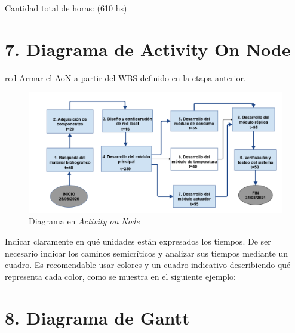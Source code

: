 \documentclass[11pt]{charter}
\begin{document}
Cantidad total de horas: (610 hs)

\section{7. Diagrama de Activity On Node}
\label{sec:AoN}

\begin{consigna}{red}
Armar el AoN a partir del WBS definido en la etapa anterior. 



\end{consigna}

\begin{figure}[htpb]
\centering 
\includegraphics[width=.8\textwidth]{./Figuras/AoN.png}
\caption{Diagrama en \textit{Activity on Node}}
\label{fig:AoN}
\end{figure}

Indicar claramente en qué unidades están expresados los tiempos.
De ser necesario indicar los caminos semicríticos y analizar sus tiempos mediante un cuadro.
Es recomendable usar colores y un cuadro indicativo describiendo qué representa cada color, como se muestra en el siguiente ejemplo:



\section{8. Diagrama de Gantt}
\label{sec:gantt}
\end{document}
